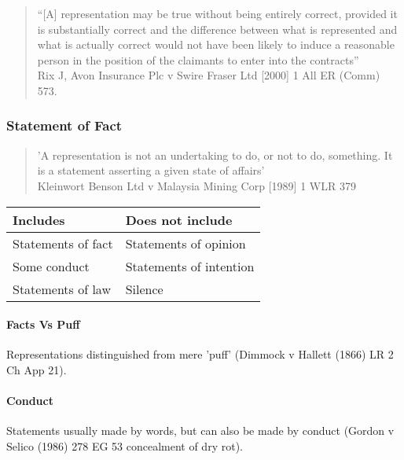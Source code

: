 \documentclass[
]{article}
\begin{document}
\begin{quote}
``{[}A{]} representation may be true without being entirely correct,
provided it is substantially correct and the difference between what is
represented and what is actually correct would not have been likely to
induce a reasonable person in the position of the claimants to enter
into the contracts''\\
Rix J, Avon Insurance Plc v Swire Fraser Ltd {[}2000{]} 1 All ER (Comm)
573.
\end{quote}

\hypertarget{statement-of-fact}{%
\subsubsection{Statement of Fact}\label{statement-of-fact}}

\begin{quote}
'A representation is not an undertaking to do, or not to do, something.
It is a statement asserting a given state of affairs'\\
Kleinwort Benson Ltd v Malaysia Mining Corp {[}1989{]} 1 WLR 379
\end{quote}

\begin{longtable}[]{@{}ll@{}}
\toprule()
Includes & Does not include \\
\midrule()
\endhead
Statements of fact & Statements of opinion \\
Some conduct & Statements of intention \\
Statements of law & Silence \\
\bottomrule()
\end{longtable}

\hypertarget{facts-vs-puff}{%
\paragraph{Facts Vs Puff}\label{facts-vs-puff}}

Representations distinguished from mere 'puff' (Dimmock v Hallett (1866)
LR 2 Ch App 21).

\hypertarget{conduct}{%
\paragraph{Conduct}\label{conduct}}

Statements usually made by words, but can also be made by conduct
(Gordon v Selico (1986) 278 EG 53 concealment of dry rot).
\end{document}
